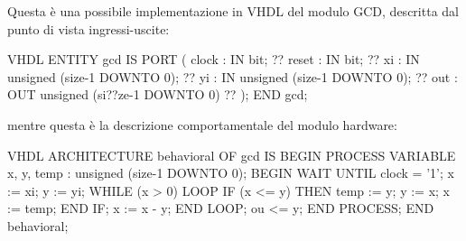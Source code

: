 \documentclass[10pt,a4paper,oneside]{scrbook}
\begin{document}
\pagebreak\noindent
Questa è una possibile implementazione in VHDL del modulo GCD, descritta dal punto di vista ingressi-uscite:
\begin{sourcecode}{VHDL}
ENTITY gcd IS
    PORT (
        clock : IN bit; ??
        reset : IN bit; ??
        xi : IN unsigned (size-1 DOWNTO 0); ??
        yi : IN unsigned (size-1 DOWNTO 0); ??
        out : OUT unsigned (si??ze-1 DOWNTO 0) ??
    );
END gcd;
\end{sourcecode}
mentre questa è la descrizione comportamentale del modulo hardware:
\begin{sourcecode}{VHDL}
ARCHITECTURE behavioral OF gcd IS
BEGIN
    PROCESS
        VARIABLE x, y, temp : unsigned (size-1 DOWNTO 0);
    BEGIN
    WAIT UNTIL clock = '1'; 
    x := xi;
    y := yi;
    WHILE (x > 0) LOOP
        IF (x <= y) THEN
            temp := y;
            y := x;
            x := temp;
        END IF;
        x := x - y;
    END LOOP;
    ou <= y;
    END PROCESS;
END behavioral;
\end{sourcecode}
\end{document}
